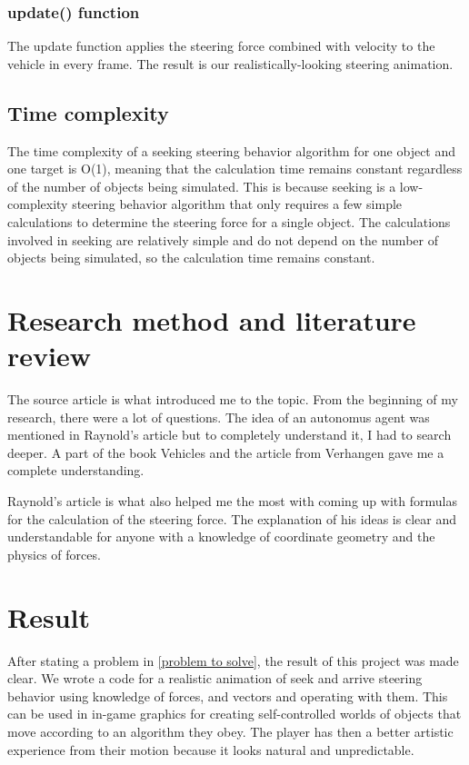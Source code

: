 \documentclass[10pt,twoside,english,a4paper]{article}
\begin{document}
\subsubsection{update() function} \label{updatef} 

The update function applies the steering force combined with velocity to the vehicle
in every frame. The result is our realistically-looking steering animation. 

\subsection{Time complexity} \label{time complexity} 

The time complexity of a seeking steering behavior algorithm 
for one object and one target is O(1), meaning that the 
calculation time remains constant regardless of the number 
of objects being simulated. This is because seeking is a 
low-complexity steering behavior algorithm that only 
requires a few simple calculations to determine the steering 
force for a single object. The calculations involved in 
seeking are relatively simple and do not depend on the 
number of objects being simulated, so the calculation time 
remains constant.

\section{Research method and literature review} \label{research method} 

The source article \cite{Raynolds} is what introduced me to the topic. 
From the beginning of my research, there were a lot of questions. 
The idea of an autonomus agent was mentioned in Raynold's article
but to completely understand it, I had to search deeper. A part of the book Vehicles 
\cite{Braitenberg} and the article from Verhangen \cite{Verhagen} gave me a complete
understanding. 

Raynold's article is what also helped me the most with coming up with formulas for
the calculation of the steering force. The explanation of his ideas is clear and 
understandable for anyone with a knowledge of coordinate geometry 
and the physics of forces. 

\section{Result} \label{results} 

After stating a problem in \ref{problem to solve}, the result of this 
project was made clear. We wrote a code for a realistic animation of seek and arrive
steering behavior using knowledge of forces, and vectors and operating with them.  
This can be used in in-game graphics for creating self-controlled worlds 
of objects that move according to an algorithm they obey. The player 
has then a better artistic experience from their motion because it looks 
natural and unpredictable. 
\end{document}
